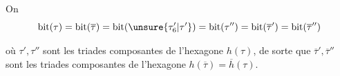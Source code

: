 On 
\[
\mathrm{bit}(\tau)=\mathrm{bit}(\overline\tau)=\mathrm{bit}(\unsure{\tau'_6|\tau'})=\mathrm{bit}(\tau'')=\mathrm{bit}(\overline\tau')=\mathrm{bit}(\overline\tau'')
\]

où $\tau',\tau''$ sont les triades composantes de l'hexagone $h(\tau)$, de sorte que $\overline\tau',\overline\tau''$ sont les triades composantes de l'hexagone $h(\overline\tau)=\overline h(\tau)$.


